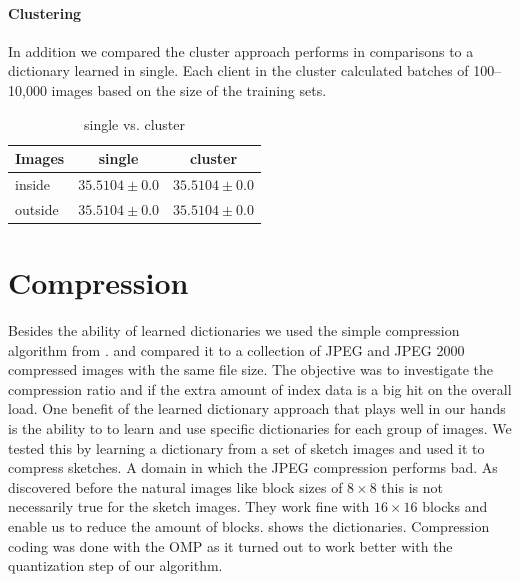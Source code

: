 \paragraph{Clustering}
In addition we compared the cluster approach performs in
comparisons to a dictionary learned in single. Each client in the cluster
calculated batches of 100--10,000 images based on the
size of the training sets.

\begin{table}[h]
\centering
\begin{tabular}{| l | c | c |}
\hline\hline
Images & single & cluster \\
\hline
inside & $35.5104 \pm 0.0$ & $35.5104 \pm 0.0$  \\
outside & $35.5104 \pm 0.0$ & $35.5104 \pm 0.0$ \\
\hline
\end{tabular}
\caption{single vs. cluster}
\end{table}


\newpage
\section{Compression}
Besides the ability of learned dictionaries 
we used the simple compression algorithm from  .
and compared it to a collection of JPEG and JPEG 2000 compressed images with the
same file size. The objective was to investigate the compression ratio and if
the extra amount of index data is a big hit on the overall load.
One benefit of the learned dictionary approach that plays well in our
hands is the ability to to learn and use specific dictionaries for each group of
images. We tested this by learning a dictionary from a set of sketch images and
used it to compress sketches. A domain in which the JPEG compression performs
bad. As discovered before the natural images like block sizes of $8\times 8$
this is not necessarily true for the sketch images. They work fine with
$16\times 16$ blocks and enable us to reduce the amount of blocks.
 shows the dictionaries. 
Compression coding was done with the OMP as it turned out to work better with
the quantization step of our algorithm. 

